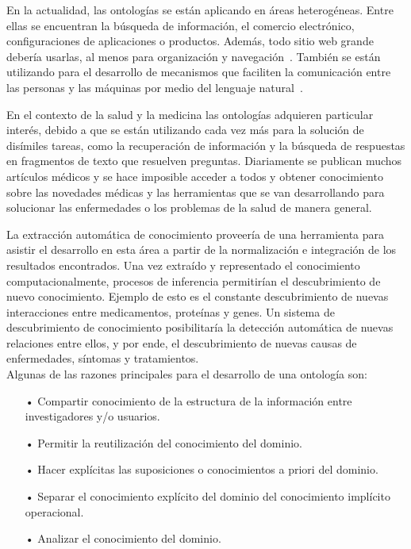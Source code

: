 En la actualidad, las ontologías se están aplicando en áreas heterogéneas. Entre ellas se encuentran la búsqueda de información, el comercio electrónico, configuraciones de aplicaciones o productos. Además, todo sitio web grande debería usarlas, al menos para organización y navegación~\cite{ref:31}. También se están utilizando para el desarrollo de mecanismos que faciliten la comunicación entre las personas y las máquinas por medio del lenguaje natural~\cite{ref:2}.

En el contexto de la salud y la medicina las ontologías adquieren particular interés, debido a que se están utilizando cada vez más para la solución de disímiles tareas, como la recuperación de información y la búsqueda de respuestas en fragmentos de texto que resuelven preguntas. Diariamente se publican muchos artículos médicos y se hace imposible acceder a todos y obtener conocimiento sobre las novedades médicas y las herramientas que se van desarrollando para solucionar las enfermedades o los problemas de la salud de manera general.

La extracción automática de conocimiento proveería de una herramienta para asistir el desarrollo en esta área a partir de la normalización e integración de los resultados encontrados. Una vez extraído y representado el conocimiento computacionalmente, procesos de inferencia permitirían el descubrimiento de nuevo conocimiento. Ejemplo de esto es el constante descubrimiento de nuevas interacciones entre medicamentos, proteínas y genes. Un sistema de descubrimiento de conocimiento posibilitaría la detección automática de
nuevas relaciones entre ellos, y por ende, el descubrimiento de nuevas causas de enfermedades, síntomas y tratamientos.\\

Algunas de las razones principales para el desarrollo de una ontología son:

\begin{itemize}
	\item[•] Compartir conocimiento de la estructura de la información entre investigadores y/o usuarios.
	\item[•] Permitir la reutilización del conocimiento del dominio.
	\item[•] Hacer explícitas las suposiciones o conocimientos a priori del dominio.
	\item[•] Separar el conocimiento explícito del dominio del conocimiento implícito operacional.
	\item[•] Analizar el conocimiento del dominio.
\end{itemize}

